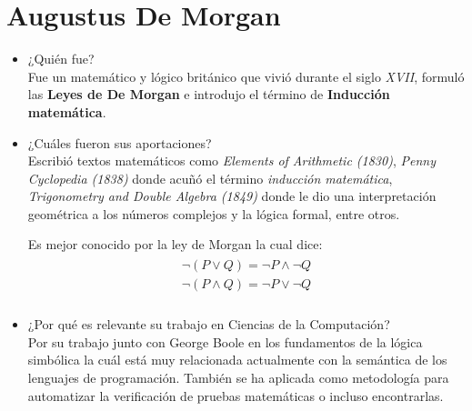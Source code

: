 \documentclass[11pt,letterpaper]{article}
\begin{document}
\section{Augustus De Morgan}
    \begin{itemize}
        \item ¿Quién fue? \\
            Fue un matemático y lógico británico que vivió durante el siglo \textit{XVII},
            formuló las \textbf{Leyes de De Morgan} e introdujo el término de
            \textbf{Inducción matemática}.

        \item ¿Cuáles fueron sus aportaciones? \\
            Escribió textos matemáticos como \textit{Elements of Arithmetic (1830)},
            \textit{Penny Cyclopedia (1838)} donde acuñó el término \textit{inducción matemática},
            \textit{Trigonometry and Double Algebra (1849)} donde le dio una interpretación
            geométrica a los números complejos y la lógica formal, entre otros.

            Es mejor conocido por la ley de Morgan la cual dice:
                \begin{equation*} \begin{split} \begin{aligned}
                    \neg (P \lor Q) = \neg P \land \neg Q \\
                    \neg (P \land Q) = \neg P \lor \neg Q \\
                \end{aligned} \end{split} \end{equation*}

        \item ¿Por qué es relevante su trabajo en Ciencias de la Computación? \\

            Por su trabajo junto con George Boole en los fundamentos de la lógica
            simbólica la cuál está muy relacionada actualmente con la semántica de
            los lenguajes de programación. También se ha aplicada como metodología
            para automatizar la verificación de pruebas matemáticas o incluso encontrarlas.
    \end{itemize}
\end{document}
